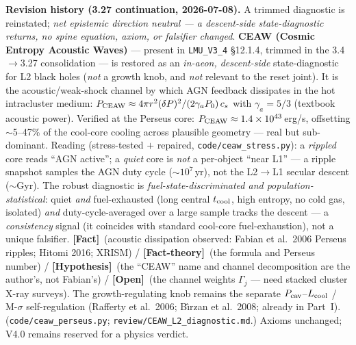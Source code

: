 \documentclass[11pt]{article}
\newcommand{\Fact}{\textbf{\textcolor{green!45!black}{[Fact]}}}
\newcommand{\factth}{\textcolor{green!40!black}{\textbf{[Fact-theory]}}}
\newcommand{\hyp}{\textcolor{orange!80!black}{\textbf{[Hypothesis]}}}
\newcommand{\open}{\textcolor{red!70!black}{\textbf{[Open]}}}
\begin{document}
{\smallskip\noindent\textbf{Revision history (3.27 continuation, 2026-07-08).} A trimmed diagnostic is reinstated; \emph{net epistemic direction neutral --- a descent-side state-diagnostic returns, no spine equation, axiom, or falsifier changed}. \textbf{CEAW (Cosmic Entropy Acoustic Waves)} --- present in \texttt{LMU\_V3\_4} \S12.1.4, trimmed in the 3.4$\to$3.27 consolidation --- is restored as an \emph{in-aeon, descent-side} state-diagnostic for L2 black holes (\emph{not} a growth knob, and \emph{not} relevant to the reset joint). It is the acoustic/weak-shock channel by which AGN feedback dissipates in the hot intracluster medium: $P_{\rm CEAW}\approx4\pi r^2(\delta P)^2/(2\gamma_a P_0)\,c_s$ with $\gamma_a=5/3$ (textbook acoustic power). Verified at the Perseus core: $P_{\rm CEAW}\approx1.4\times10^{43}$\,erg/s, offsetting $\sim$5--47\% of the cool-core cooling across plausible geometry --- real but sub-dominant. Reading (stress-tested $+$ repaired, \texttt{code/ceaw\_stress.py}): a \emph{rippled} core reads ``AGN active''; a \emph{quiet} core is \emph{not} a per-object ``near L1'' --- a ripple snapshot samples the AGN duty cycle ($\sim$$10^7$\,yr), not the L2$\to$L1 secular descent ($\sim$Gyr). The robust diagnostic is \emph{fuel-state-discriminated and population-statistical}: quiet \emph{and} fuel-exhausted (long central $t_{\rm cool}$, high entropy, no cold gas, isolated) \emph{and} duty-cycle-averaged over a large sample tracks the descent --- a \emph{consistency} signal (it coincides with standard cool-core fuel-exhaustion), not a unique falsifier. \Fact\ (acoustic dissipation observed: Fabian et al.\ 2006 Perseus ripples; Hitomi 2016; XRISM) / \factth\ (the formula and Perseus number) / \hyp\ (the ``CEAW'' name and channel decomposition are the author's, not Fabian's) / \open\ (the channel weights $\Gamma_j$ --- need stacked cluster X-ray surveys). The growth-regulating knob remains the separate $P_{\rm cav}$--$L_{\rm cool}$ / M-$\sigma$ self-regulation (Rafferty et al.\ 2006; B\^{\i}rzan et al.\ 2008; already in Part~I). (\texttt{code/ceaw\_perseus.py}; \texttt{review/CEAW\_L2\_diagnostic.md}.) Axioms unchanged; V4.0 remains reserved for a physics verdict.

}
\end{document}
